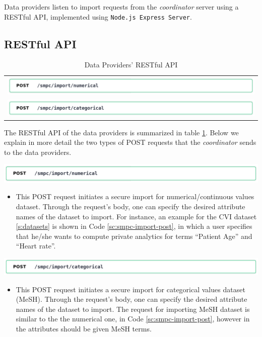 Data providers listen to import requests from the \textit{coordinator} server using a RESTful API, implemented using \texttt{Node.js Express Server}.



\subsection{RESTful API}\label{ss:data-providers-restful-api}


\begin{table}[H]
  \centering
  \caption{Data Providers' RESTful API}
  \label{t:data-providers-api}
\begin{tabular}{l}
  \includegraphics[page=1,width=\textwidth]{figures/post4.pdf} \\
  \includegraphics[page=1,width=\textwidth]{figures/post5.pdf} \\
\end{tabular}
\end{table}


The RESTful API of the data providers is summarized in table \ref{t:data-providers-api}.
Below we explain in more detail the two types of POST requests that the \textit{coordinator} sends to the data providers.

\includegraphics[page=1,width=\textwidth]{figures/post4.pdf}
\begin{itemize}
\item[]
This POST request initiates a secure import for numerical/continuous values dataset.
Through the request's body, one can specify the desired attribute names of the dataset to import.
For instance, an example for the CVI dataset \ref{s:datasets} is shown in Code \ref{sc:smpc-import-post}, in which a user specifies that he/she wants to compute private analytics for terms ``Patient Age'' and ``Heart rate''.
\end{itemize}

\includegraphics[page=1,width=\textwidth]{figures/post5.pdf}
\begin{itemize}
\item[]
This POST request initiates a secure import for categorical values dataset (MeSH).
Through the request's body, one can specify the desired attribute names of the dataset to import.
The request for importing MeSH dataset is similar to the the numerical one, in Code \ref{sc:smpc-import-post}, however in the attributes should be given MeSH terms.

\end{itemize}

